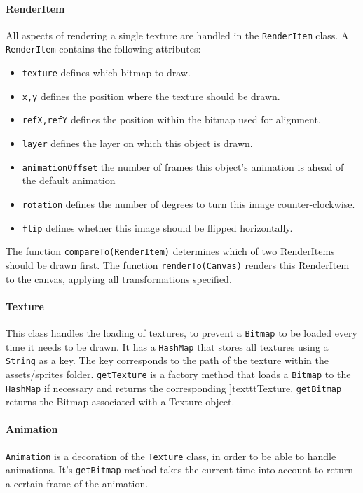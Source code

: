 \documentclass[../main.tex]{subfiles}
\begin{document}
        \paragraph{RenderItem} All aspects of rendering a single texture are handled in the \texttt{RenderItem} class. A \texttt{RenderItem} contains the following attributes: 
        \begin{itemize}
        	\item \texttt{texture} defines which bitmap to draw.
        	\item \texttt{x,y} defines the position where the texture should be drawn.
        	\item \texttt{refX,refY} defines the position within the bitmap used for alignment.
        	\item \texttt{layer} defines the layer on which this object is drawn.
        	\item \texttt{animationOffset} the number of frames this object's animation is ahead of the default animation
        	\item \texttt{rotation} defines the number of degrees to turn this image counter-clockwise.
        	\item \texttt{flip} defines whether this image should be flipped horizontally.
        \end{itemize}
        The function \texttt{compareTo(RenderItem)} determines which of two RenderItems should be drawn first. The function \texttt{renderTo(Canvas)} renders this RenderItem to the canvas, applying all transformations specified.

        \paragraph{Texture} This class handles the loading of textures, to prevent a \texttt{Bitmap} to be loaded every time it needs to be drawn. It has a \texttt{HashMap} that stores all textures using a \texttt{String} as a key. The key corresponds to the path of the texture within the assets/sprites folder. \texttt{getTexture} is a factory method that loads a \texttt{Bitmap} to the \texttt{HashMap} if necessary and returns the corresponding ]texttt{Texture}. \texttt{getBitmap} returns the Bitmap associated with a Texture object.

        \paragraph{Animation} \texttt{Animation} is a decoration of the \texttt{Texture} class, in order to be able to handle animations. It's \texttt{getBitmap} method takes the current time into account to return a certain frame of the animation.
\end{document}
